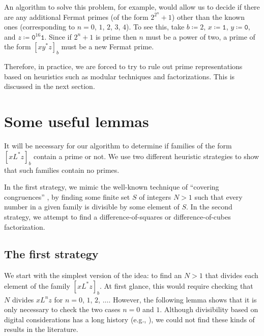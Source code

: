 \documentclass[12pt]{article}
\theoremstyle{plain}
\theoremstyle{definition}
\newcommand{\0}{\mathtt{0}}
\newcommand{\1}{\mathtt{1}}
\newcommand{\2}{\mathtt{2}}
\newcommand{\3}{\mathtt{3}}
\newcommand{\4}{\mathtt{4}}
\newcommand{\5}{\mathtt{5}}
\newcommand{\6}{\mathtt{6}}
\newcommand{\7}{\mathtt{7}}
\newcommand{\8}{\mathtt{8}}
\newcommand{\9}{\mathtt{9}}
\begin{document}
An algorithm to solve this problem, for example, would allow us to decide
if there are any additional Fermat primes (of the form $2^{2^n}+1$)
other than the known ones (corresponding to $n = 0$, $1$, $2$, $3$, $4$).
To see this, take $b\coloneqq2$, $x\coloneqq\1$, $y\coloneqq\0$, and $z\coloneqq\0^{16}\1$.
Since if $2^n+1$ is prime then $n$ must be a power of two, a prime of the
form $[xy^*z]_b$ must be a new Fermat prime.

Therefore, in practice, we are forced to try to rule out prime
representations based on heuristics such as
modular techniques and factorizations.
This is discussed in the next section.

\section{Some useful lemmas}\label{seclemmas}
It will be necessary for our algorithm to determine if families of the
form $[xL^*z]_b$ contain a prime or not.  We use two different 
heuristic strategies
to show that such families contain no primes.

In the first strategy, we mimic the well-known technique of ``covering
congruences'' \cite{Choi},
by finding some finite set $S$ of integers $N > 1$ such that
every number in a given family is divisible by some element of $S$.
In the second strategy, we attempt to find a
difference-of-squares or difference-of-cubes factorization.

\subsection{The first strategy}\label{subsecfirststrat}

We start with the simplest version of the idea:  to find 
an $N > 1$ that divides each element of the family $[xL^*z]_b$.
At first glance, this would require
checking that $N$ divides $xL^nz$ for $n=0$, $1$, $2$, $\dotsc$.
However, the following lemma shows that it is only necessary to check
the two cases $n=0$ and $1$.  Although divisibility based on digital
considerations has a long history (e.g., \cite[Chap.~XII]{Dick}),
we could not find these kinds of results in the literature.
\end{document}

